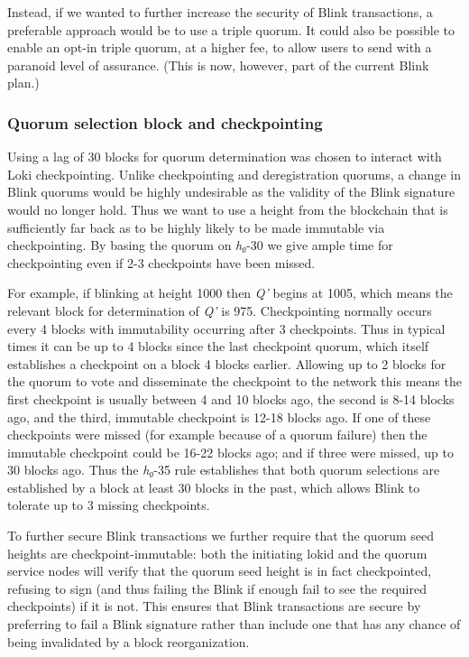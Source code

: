 Instead, if we wanted to further increase the security of Blink
transactions, a preferable approach would be to use a triple quorum. It
could also be possible to enable an opt-in triple quorum, at a higher
fee, to allow users to send with a paranoid level of assurance. (This is
now, however, part of the current Blink plan.)

\hypertarget{quorum-selection-block-and-checkpointing}{%
\subsubsection{Quorum selection block and
checkpointing}\label{quorum-selection-block-and-checkpointing}}

Using a lag of 30 blocks for quorum determination was chosen to interact
with Loki checkpointing. Unlike checkpointing and deregistration
quorums, a change in Blink quorums would be highly undesirable as the
validity of the Blink signature would no longer hold. Thus we want to
use a height from the blockchain that is sufficiently far back as to be
highly likely to be made immutable via checkpointing. By basing the
quorum on \emph{h₀}-30 we give ample time for checkpointing even if 2-3
checkpoints have been missed.

For example, if blinking at height 1000 then \emph{Q'} begins at 1005,
which means the relevant block for determination of \emph{Q'} is 975.
Checkpointing normally occurs every 4 blocks with immutability occurring
after 3 checkpoints. Thus in typical times it can be up to 4 blocks
since the last checkpoint quorum, which itself establishes a checkpoint
on a block 4 blocks earlier. Allowing up to 2 blocks for the quorum to
vote and disseminate the checkpoint to the network this means the first
checkpoint is usually between 4 and 10 blocks ago, the second is 8-14
blocks ago, and the third, immutable checkpoint is 12-18 blocks ago. If
one of these checkpoints were missed (for example because of a quorum
failure) then the immutable checkpoint could be 16-22 blocks ago; and if
three were missed, up to 30 blocks ago. Thus the \emph{h₀}-35 rule
establishes that both quorum selections are established by a block at
least 30 blocks in the past, which allows Blink to tolerate up to 3
missing checkpoints.

To further secure Blink transactions we further require that the quorum
seed heights are checkpoint-immutable: both the initiating lokid and the
quorum service nodes will verify that the quorum seed height is in fact
checkpointed, refusing to sign (and thus failing the Blink if enough
fail to see the required checkpoints) if it is not. This ensures that
Blink transactions are secure by preferring to fail a Blink signature
rather than include one that has any chance of being invalidated by a
block reorganization.

